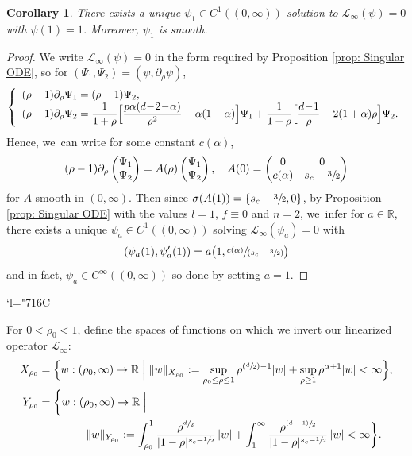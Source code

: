 \documentclass[10pt]{amsart}
\newcommand{\Changelback}{\mathcode`l="716C}
\newcommand{\Psfrac}[2]{(\sfrac{#1}{#2})}
\newcommand{\psfrac}[2]{\sfrac{(#1)}{#2}}
\newcommand{\spfrac}[2]{\sfrac{#1}{(#2)}}
\let\dpl\displaystyle
\let\ra\rightarrow
\theoremstyle{plain}
\newtheorem{corollary}[proposition]{Corollary}
\theoremstyle{definition}
\begin{document}
\begin{corollary}
\label{Cor: psi_1}
There exists a unique $\psi_1\in C^1((0,\infty))$ solution to $\mathcal L_\infty (\psi)=0$ with $\psi(1)=1$. Moreover, $\psi_1$ is smooth.
\end{corollary}
\begin{proof}
We write $\mathcal L_\infty(\psi)=0$ in the form required by Proposition \ref{prop: Singular ODE}, so for $(\Psi_1,\Psi_2)=(\psi,\partial_\rho\psi)$,
\[
\left\{\begin{array}{l}
(\rho-1)\partial_\rho\Psi_1=(\rho-1)\Psi_2,\\
\dpl(\rho-1)\partial_\rho\Psi_2=\frac{1}{1+\rho}\Bigl[\frac{p\alpha(d\!-\!2\!-\!\alpha)}{\rho^2}-\alpha(1+\alpha)\Bigr]\Psi_1+\frac{1}{1+\rho}\Bigl[\frac{d\!-\!1}{\rho}-2(1+\alpha)\rho\Bigr]\Psi_2.
\end{array}\right.
\]
Hence, we~can write for some constant $c(\alpha)$,
\[
(\rho-1)\partial_\rho
\begin{pmatrix}
\Psi_1\\ \Psi_2
\end{pmatrix}
=A(\rho)
\begin{pmatrix}
\Psi_1\\ \Psi_2
\end{pmatrix},
\quad A(0)=
\begin{pmatrix}
0 & 0\\
c(\alpha) & s_c-\sfrac{3}{2}
\end{pmatrix}
\]
for $A$ smooth in $(0,\infty)$. Then since $\sigma(A(1))=\{s_c-\sfrac{3}{2},0\}$, by Proposition \ref{prop: Singular ODE} with the values $l=1$, $f\equiv 0$ and $n=2$, we~infer for $a\in\mathbb R$, there exists a unique $\psi_a\in C^1((0,\infty))$ solving $\mathcal L_\infty(\psi_a)=0$ with
\[
(\psi_a(1),\psi_a'(1))=a\bigl(1,\spfrac{c(\alpha)} {s_c-\sfrac 32}\bigr)
\]
and in fact, $\psi_a\in C^\infty((0,\infty))$ so done by setting $a=1$.
\end{proof}

\Changelback

For $0<\rho_0<1$, define the spaces of functions on which we invert our linearized operator $\mathcal L_\infty$:
\begin{equation}
\label{eq: X_rho_0}
\begin{aligned}
X_{\rho_0}&=\Big\{ w:(\rho_0,\infty)\ra \mathbb R\Bigm| \Vert w\Vert_{X_{\rho_0}}:=\sup_{\rho_0\le\rho\le1}\rho^{\Psfrac{d}{2}-1} |w|+\sup_{\rho\ge1}\rho^{\alpha+1}|w|<\infty\Big\},\\
Y_{\rho_0}&=\bigg\{ w:(\rho_0,\infty)\ra \mathbb R\Bigm|\\
&\hspace*{1.5cm}\Vert w\Vert_{Y_{\rho_0}}:=\int_{\rho_0}^1 \frac{\rho^{\sfrac{d}{2}}}{|1-\rho|^{s_c-\sfrac{1}{2}}}\,|w|+\int_{1}^\infty \frac{\rho^{\psfrac{d-1}{2}}}{|1-\rho|^{s_c-\sfrac{1}{2}}}\,|w|<\infty\bigg\}.
\end{aligned}
\end{equation}
\end{document}
